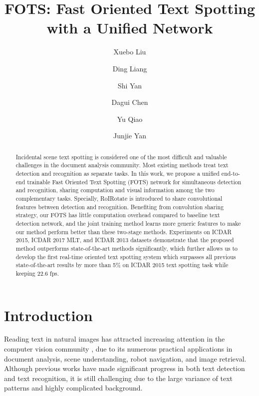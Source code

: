 \documentclass[10pt,twocolumn,letterpaper]{article}
\begin{document}
\title{FOTS: Fast Oriented Text Spotting with a Unified Network\vspace{-1cm}}

\author[1]{\normalsize Xuebo Liu}
\author[1]{Ding Liang}
\author[1]{Shi Yan}
\author[1]{Dagui Chen}
\author[2]{Yu Qiao}
\author[1]{Junjie Yan\vspace{-0.3cm}}

\maketitle
\thispagestyle{empty}

\begin{abstract}
  Incidental scene text spotting is considered one of the most difficult and valuable challenges in the document analysis community. Most existing methods treat text detection and recognition as separate tasks. In this work, we propose a unified end-to-end trainable Fast Oriented Text Spotting (FOTS) network for simultaneous detection and recognition, sharing computation and visual information among the two complementary tasks. Specially, RoIRotate is introduced to share convolutional features between detection and recognition. Benefiting from convolution sharing strategy, our FOTS has little computation overhead compared to baseline text detection network, and the joint training method learns more generic features to make our method perform better than these two-stage methods. Experiments on ICDAR 2015, ICDAR 2017 MLT, and ICDAR 2013 datasets demonstrate that the proposed method outperforms state-of-the-art methods significantly, which further allows us to develop the first real-time oriented text spotting system which surpasses all previous state-of-the-art results by more than 5\% on ICDAR 2015 text spotting task while keeping 22.6 fps.

\end{abstract}

\section{Introduction}

Reading text in natural images has attracted increasing attention in the computer vision community \cite{tian2016ctpn,shi2017seglink,zhou2017east,shi2016crnn,he2016first,he2017casia,liao2017textboxes}, due to its numerous practical applications in document analysis, scene understanding, robot navigation, and image retrieval. Although previous works have made significant progress in both text detection and text recognition, it is still challenging due to the large variance of text patterns and highly complicated background.
\end{document}
